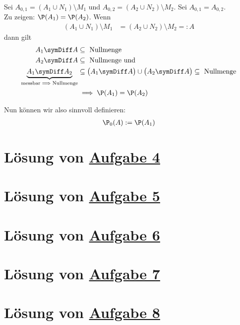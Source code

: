 \\
Sei $A_{0,1}=(A_1\cup N_1)\setminus M_1$ und $A_{0,2}=(A_2\cup N_2)\setminus M_2$.
Sei $A_{0,1}=A_{0,2}$.\\
Zu zeigen: $\P(A_1)=\P(A_2)$.
Wenn 
\begin{align*}
	(A_1\cup N_1)\setminus M_1
	&=(A_2\cup N_2)\setminus M_2=:A
\end{align*}
dann gilt
\begin{align*}
	A_1\symDiff A&\subseteq\text{ Nullmenge}\\
	A_2\symDiff A&\subseteq\text{ Nullmenge und}\\
	\underbrace{A_1\symDiff A_2}_{
		\text{messbar}\implies\text{Nullmenge}
	} &\subseteq\big(A_1\symDiff A\big)\cup\big(A_2\symDiff A\big)\subseteq\text{ Nullmenge}\\
	&\implies \P(A_1)=\P(A_2)
\end{align*}

Nun können wir also sinnvoll definieren:
\begin{align*}
	\P_0(A):=\P(A_1)
\end{align*}



\section{Lösung von 
	\texorpdfstring{\hyperref[aufg:4]{Aufgabe 4}}{}
}\label{loes:4}

\section{Lösung von 
	\texorpdfstring{\hyperref[aufg:5]{Aufgabe 5}}{}
}\label{loes:5}

\section{Lösung von 
	\texorpdfstring{\hyperref[aufg:6]{Aufgabe 6}}{}
}\label{loes:6}

\section{Lösung von 
	\texorpdfstring{\hyperref[aufg:7]{Aufgabe 7}}{}
}\label{loes:7}

\section{Lösung von 
	\texorpdfstring{\hyperref[aufg:8]{Aufgabe 8}}{}
}\label{loes:8}

